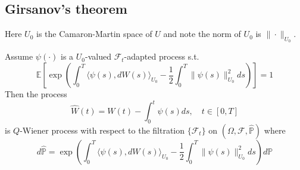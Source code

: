 \subsection{Girsanov's theorem}
Here $U_0$ is the Camaron-Martin space of $U$ and note the norm of $U_0$ is $\|\cdot\|_{U_0}$.
\begin{theorem}
    Assume $\psi(\cdot)$ is a $U_0$-valued $\mathscr{F}_t$-adapted process s.t.
    \begin{equation}
        \mathbb{E}\left[\exp\left(\int_0^T\langle \psi(s), dW(s)\rangle_{U_0}-\frac{1}{2}\int_0^T\|\psi(s)\|_{U_0}^2ds\right)\right] = 1
    \end{equation}
    Then the process
    \begin{equation}
        \widehat{W}(t) = W(t) - \int_0^t \psi(s)ds, \quad t\in [0, T]
    \end{equation}
    is $Q$-Wiener process with respect to the filtration $\{\mathscr{F}_t\}$ on $(\Omega, \mathscr{F}, \widehat{\mathbb{P}})$ where
    \begin{equation}
        d\widehat{\mathbb{P}} = \exp\left(\int_0^T\langle \psi(s), dW(s)\rangle_{U_0}-\frac{1}{2}\int_0^T\|\psi(s)\|_{U_0}^2ds\right)d\mathbb{P}
    \end{equation}
\end{theorem}








